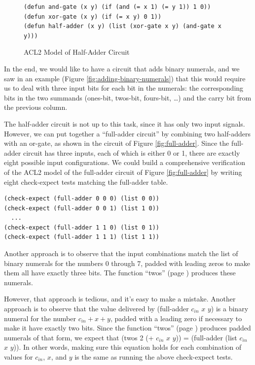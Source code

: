 \begin{figure}
\begin{lstlisting}
(defun and-gate (x y) (if (and (= x 1) (= y 1)) 1 0))
(defun xor-gate (x y) (if (= x y) 0 1))
(defun half-adder (x y) (list (xor-gate x y) (and-gate x y)))
\end{lstlisting}
\caption{ACL2 Model of Half-Adder Circuit}
\label{fig:half-adder-model}
\end{figure}

In the end, we would like to have a circuit
that adds binary numerals,
and we saw in an example (Figure \ref{fig:adding-binary-numerals})
that this would require us to deal with three input bits
for each bit in the numerals:
the corresponding bits in the two summands (ones-bit, twos-bit,
fours-bit, \dots) and the carry bit from the previous column.

The half-adder circuit is not up to this task,
since it has only two input signals.
However, we can put together a ``full-adder circuit''
by combining two half-adders with an or-gate,
as shown in the circuit of Figure \ref{fig:full-adder}.
Since the full-adder circuit has three inputs,
each of which is either 0 or 1,
there are exactly eight possible input configurations.
We could build a comprehensive verification of
the ACL2 model of the full-adder
circuit of Figure \ref{fig:full-adder} by writing
eight check-expect tests matching the full-adder table.

\begin{lstlisting}
(check-expect (full-adder 0 0 0) (list 0 0))
(check-expect (full-adder 0 0 1) (list 1 0))
  ...
(check-expect (full-adder 1 1 0) (list 0 1))
(check-expect (full-adder 1 1 1) (list 1 1))
\end{lstlisting}

Another approach is to observe
that the input combinations
match the list of binary numerals for the numbers 0 through 7,
padded with leading zeros to make them all have exactly three bits.
The function ``twos'' (page \pageref{twos-defun}) produces these numerals.

However, that approach is tedious, and it's easy to make a mistake.
Another approach is to observe that
the value delivered by (full-adder $c_{in}$ $x$ $y$)
is a binary numeral for the number $c_{in} + x + y$,
padded with a leading zero if necessary to make it have exactly two bits.
Since the function ``twos'' (page \pageref{twos-defun}) produces padded
numerals of that form, we expect that
(twos 2 (+ $c_{in}$ $x$ $y$)) = (full-adder (list $c_{in}$ $x$ $y$)).
In other words, making sure this equation holds
for each combination of values for $c_{in}$, $x$, and $y$
is the same as running the above check-expect tests.

